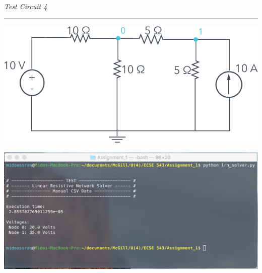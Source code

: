 \documentclass[11pt]{amsart}
\begin{document}
\begin{minipage}{\textwidth}
    \textit{Test Circuit 4}\\
    \noindent\rule[0.5ex]{\linewidth}{0.5pt}
\end{minipage}
\begin{minipage}{0.25\textwidth}
\end{minipage}
\begin{minipage}{0.8\textwidth}
	\begin{center}
		\vspace{2em}
        		\includegraphics[width=\textwidth]{assets/sk_test_c4.png}
	\end{center}
\end{minipage}
\begin{minipage}{\textwidth}
	\vspace{2em}
	\centering
	\includegraphics[width=\textwidth]{assets/test_c4.png}\\
\end{minipage}
\pagebreak
\end{document}
